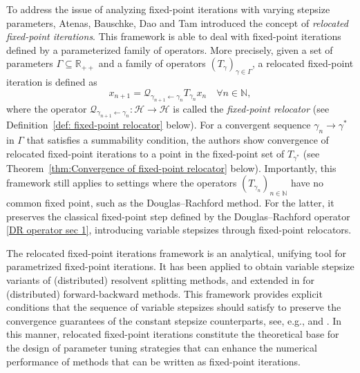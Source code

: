 \documentclass[a4paper,12pt]{article}
\begin{document}
To address the issue of analyzing  fixed-point iterations with varying stepsize parameters, Atenas, Bauschke, Dao and Tam \cite{atenas2025relocated} introduced the concept of \emph{relocated fixed-point iterations}.  This framework is able to deal with fixed-point iterations defined by a parameterized family of operators. More precisely, given a set of parameters $\Gamma \subseteq \mathbb{R}_{++}$ and a family of operators $(T_{\gamma})_{\gamma \in \Gamma}$, a {relocated fixed-point iteration} is defined as \begin{equation*}
x_{n+1} = \mathcal{Q}_{\gamma_{n+1}\gets \gamma_n}T_{\gamma_n}x_n \quad \forall n\in\mathbb{N},
\end{equation*} where the operator $\mathcal{Q}_{\gamma_{n+1}\gets \gamma_n}\colon\mathcal{H}\to\mathcal{H}$ is called the \emph{fixed-point relocator} (see Definition~\ref{def: fixed-point relocator} below). For a convergent sequence $\gamma_n \to \gamma^*$ in $\Gamma$ that satisfies a summability condition, the authors show convergence of relocated fixed-point iterations to a point in the fixed-point set of $T_{\gamma^*}$ 
(see Theorem~\ref{thm:Convergence of fixed-point relocator} below). Importantly, this framework still applies to settings where the operators $(T_{\gamma_n})_{n\in\mathbb{N}}$ have no common fixed point, such as the Douglas--Rachford method. For the latter, it preserves the classical fixed-point step defined by the Douglas--Rachford operator \eqref{DR operator sec 1}, introducing variable stepsizes through fixed-point relocators. 

The relocated fixed-point iterations framework is an analytical, unifying tool for parametrized fixed-point iterations. It has been applied to obtain variable stepsize variants of (distributed) resolvent splitting methods, and extended in \cite{atenas2026variable} for (distributed) forward-backward methods. This framework provides explicit conditions that the sequence of variable stepsizes should satisfy to preserve the convergence guarantees of the constant stepsize counterparts, see, e.g., \cite[Section 5]{atenas2025relocated} and \cite[Sections 4 \& 5]{atenas2026variable}. In this manner, relocated fixed-point iterations constitute the theoretical base for the design of parameter tuning strategies that can enhance the numerical performance of methods that can be written as fixed-point iterations.
\end{document}
